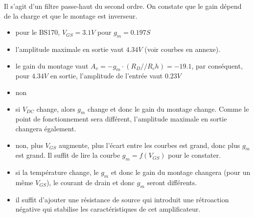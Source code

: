 \documentclass{../template/tp}
\begin{document}
{\begin{itemize}
		Il s'agit d'un filtre passe-haut du second ordre.
		On constate que le gain dépend de la charge et que le montage est inverseur.
\end{itemize}
	


}

{
\begin{itemize}
\item pour le BS170, $V_{GS}=3.1V$ pour $g_m=0.197S$
\item l'amplitude maximale en sortie vaut $4.34V$ (voir courbes en annexe).
\item le gain du montage vaut $A_v=-g_m\cdot \left(R_D//R_ch\right)=-19.1$, par conséquent, pour $4.34V$ en sortie, l'amplitude de l'entrée vaut $0.23V$
\item non
\item si $V_{DC}$ change, alors $g_m$ change et donc le gain du montage change. Comme le point de fonctionnement sera différent, l'amplitude maximale en sortie changera également.
\item non, plus $V_{GS}$ augmente, plus l'écart entre les courbes est grand, donc plus $g_m$ est grand. Il suffit de lire la courbe $g_m=f(V_{GS})$ pour le constater.
\item si la température change, le $g_m$ et donc le gain du montage changera (pour un même $V_{GS}$), le courant de drain et donc $g_m$ seront différents.
\item il suffit d'ajouter une résistance de source qui introduit une rétroaction négative qui stabilise les caractéristiques de cet amplificateur. 
\end{itemize}
}
\end{document}
